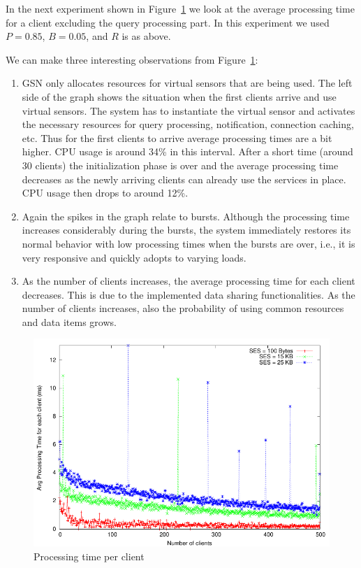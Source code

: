 In the next experiment shown in Figure~\ref{fig:ProcessingTimePerClient} we
look at the average processing time for a client excluding the query processing
part. In this experiment we used $P=0.85$, $B=0.05$, and $R$ is as above. 

We can make three interesting observations from
Figure~\ref{fig:ProcessingTimePerClient}:

\begin{enumerate}
\item  GSN only allocates resources for virtual sensors that are being
  used. The left side of the graph shows the situation when the first
  clients arrive and use virtual sensors. The system has to instantiate
  the virtual sensor and activates the necessary resources for query
  processing, notification, connection caching, etc. Thus for the
  first clients to arrive average processing times are a bit
  higher. CPU usage is around 34\% in this interval. After a short
  time (around 30 clients) the initialization phase is over and the
  average processing time decreases as the newly arriving clients can
  already use the services in place. CPU usage then drops to around
  12\%.
  
\item Again the spikes in the graph relate to bursts. Although the processing
  time increases considerably during the bursts, the system immediately
  restores its normal behavior with low processing times when the bursts are
  over, i.e., it is very responsive and quickly adopts to varying loads.

\item As the number of clients increases, the average processing time
  for each client decreases. This is due to the implemented data
  sharing functionalities. As the number of clients increases, also
  the probability of using common resources and data items grows.
\end{enumerate}

\begin{figure}%
  \centering
  \includegraphics[width=0.8\columnwidth]{ch-gsn-figures/processing-time-per-client}
  \caption{Processing time per client}
  \label{fig:ProcessingTimePerClient}
\end{figure}

